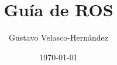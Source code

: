 \documentclass[draft]{book}
\begin{document}
\title{Guía de ROS}
\author{Gustavo Velasco-Hernández}
\date{\today}
\maketitle

\tableofcontents
\setcounter{tocdepth}{3}







\end{document}
